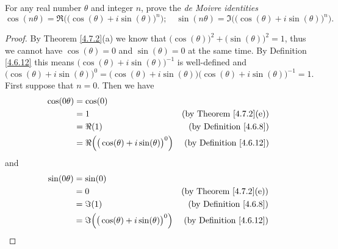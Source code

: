 \begin{exercise}\label{ex 4.7.7}
    For any real number \(\theta\) and integer \(n\), prove the \emph{de Moivre identities}
    \[
        \cos(n \theta) = \Re\Big(\big(\cos(\theta) + i \sin(\theta)\big)^n\Big); \quad \sin(n \theta) = \Im\Big(\big(\cos(\theta) + i \sin(\theta)\big)^n\Big).
    \]
\end{exercise}

\begin{proof}
    By Theorem \ref{4.7.2}(a) we know that \(\big(\cos(\theta)\big)^2 + \big(\sin(\theta)\big)^2 = 1\), thus we cannot have \(\cos(\theta) = 0\) and \(\sin(\theta) = 0\) at the same time.
    By Definition \ref{4.6.12} this means \(\big(\cos(\theta) + i \sin(\theta)\big)^{-1}\) is well-defined and
    \[
        \big(\cos(\theta) + i \sin(\theta)\big)^0 = \big(\cos(\theta) + i \sin(\theta)\big) \big(\cos(\theta) + i \sin(\theta)\big)^{-1} = 1.
    \]
    First suppose that \(n = 0\).
    Then we have
    \begin{align*}
        \cos(0 \theta) & = \cos(0)                                                                                      \\
                       & = 1                                                      & \text{(by Theorem \ref{4.7.2}(e))}  \\
                       & = \Re(1)                                                 & \text{(by Definition \ref{4.6.8})}  \\
                       & = \Re\Big(\big(\cos(\theta) + i \sin(\theta)\big)^0\Big) & \text{(by Definition \ref{4.6.12})}
    \end{align*}
    and
    \begin{align*}
        \sin(0 \theta) & = \sin(0)                                                                                      \\
                       & = 0                                                      & \text{(by Theorem \ref{4.7.2}(e))}  \\
                       & = \Im(1)                                                 & \text{(by Definition \ref{4.6.8})}  \\
                       & = \Im\Big(\big(\cos(\theta) + i \sin(\theta)\big)^0\Big) & \text{(by Definition \ref{4.6.12})}
    \end{align*}


\end{proof}
